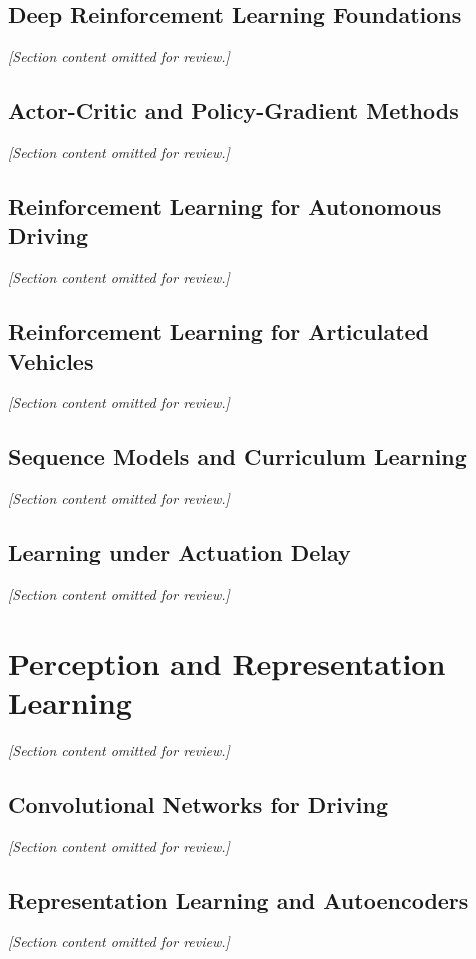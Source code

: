 \subsection{Deep Reinforcement Learning Foundations}
\textit{[Section content omitted for review.]}

\subsection{Actor-Critic and Policy-Gradient Methods}
\textit{[Section content omitted for review.]}

\subsection{Reinforcement Learning for Autonomous Driving}
\textit{[Section content omitted for review.]}

\subsection{Reinforcement Learning for Articulated Vehicles}
\textit{[Section content omitted for review.]}

\subsection{Sequence Models and Curriculum Learning}
\textit{[Section content omitted for review.]}

\subsection{Learning under Actuation Delay}
\textit{[Section content omitted for review.]}

\section{Perception and Representation Learning}
\textit{[Section content omitted for review.]}

\subsection{Convolutional Networks for Driving}
\textit{[Section content omitted for review.]}

\subsection{Representation Learning and Autoencoders}
\textit{[Section content omitted for review.]}


